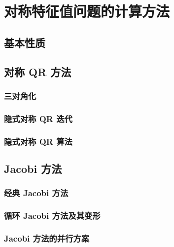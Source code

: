 \chapter{对称特征值问题的计算方法}

\section{基本性质}

\pending

\section{对称 QR 方法}

\subsection{三对角化}

\pending

\subsection{隐式对称 QR 迭代}

\pending

\subsection{隐式对称 QR 算法}

\pending

\section{Jacobi 方法}

\subsection{经典 Jacobi 方法}

\pending

\subsection{循环 Jacobi 方法及其变形}

\pending

\subsection{Jacobi 方法的并行方案}

\pending


